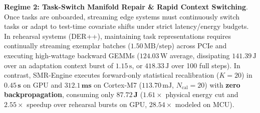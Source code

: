 \documentclass{article}
\begin{document}
\noindent\textbf{Regime 2: Task-Switch Manifold Repair \& Rapid Context Switching}. Once tasks are onboarded, streaming edge systems must continuously switch tasks or adapt to test-time covariate shifts under strict latency/energy budgets. In rehearsal systems (DER++), maintaining task representations requires continually streaming exemplar batches ($1.50\,\text{MB/step}$) across PCIe and executing high-wattage backward GEMMs ($124.03\,\text{W}$ average, dissipating $141.39\,\text{J}$ over an adaptation context burst of $1.15\,\text{s}$, or $418.33\,\text{J}$ over 100 full steps). In contrast, SMR-Engine executes forward-only statistical recalibration ($K=20$) in $\mathbf{0.45\,\text{s}}$ on GPU and $\mathbf{312.1\,\text{ms}}$ on Cortex-M7 ($113.70\,\text{mJ}$, $N_{\mathrm{cal}}=20$) with \textbf{zero backpropagation}, consuming only $\mathbf{87.72\,\text{J}}$ ($1.61\times$ physical energy cut and $2.55\times$ speedup over rehearsal bursts on GPU, $28.54\times$ modeled on MCU).
\end{document}

